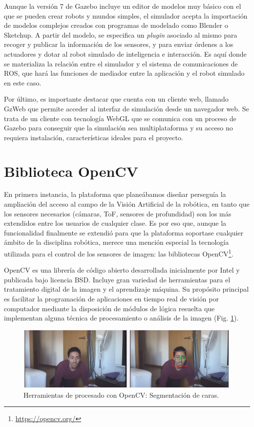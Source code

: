 Aunque la versión 7 de Gazebo incluye un editor de modelos muy básico con el que se pueden crear robots y mundos simples, el simulador acepta la importación de modelos complejos creados con programas de modelado como Blender o Sketchup. A partir del modelo, se especifica un \textit{plugin} asociado al mismo para recoger y publicar la información de los sensores, y para enviar órdenes a los actuadores y dotar al robot simulado de inteligencia e interacción. Es aquí donde se materializa la relación entre el simulador y el sistema de comunicaciones de ROS, que hará las funciones de mediador entre la aplicación y el robot simulado en este caso.

Por último, es importante destacar que cuenta con un cliente web, llamado GzWeb que permite acceder al interfaz de simulación desde un navegador web. Se trata de un cliente con tecnología WebGL que se comunica con un proceso de Gazebo para conseguir que la simulación sea multiplataforma y su acceso no requiera instalación, características ideales para el proyecto.

\section{Biblioteca OpenCV}
En primera instancia, la plataforma que planeábamos diseñar perseguía la ampliación del acceso al campo de la Visión Artificial de la robótica, en tanto que los sensores necesarios (cámaras, ToF, sensores de profundidad) son los más extendidos entre los usuarios de cualquier clase. Es por eso que, aunque la funcionalidad finalmente se extendió para que la plataforma soportase cualquier ámbito de la disciplina robótica, merece una mención especial la tecnología utilizada para el control de los sensores de imagen: las bibliotecas OpenCV\footnote{\url{https://opencv.org/}}.

OpenCV es una librería de código abierto desarrollada inicialmente por Intel y publicada bajo licencia BSD. Incluye gran variedad de herramientas para el tratamiento digital de la imagen y el aprendizaje máquina. Su propósito principal es facilitar la programación de aplicaciones en tiempo real de visión por computador mediante la disposición de módulos de lógica resuelta que implementan alguna técnica de procesamiento o análisis de la imagen (Fig. \ref{opencv}).

\begin{figure}[!hbtp]  \centering\noindent
    \includegraphics[width=0.99\textwidth]{figures/opencv-face.png}
    \caption{Herramientas de procesado con OpenCV: Segmentación de caras.}
    \label{opencv}
\end{figure}

